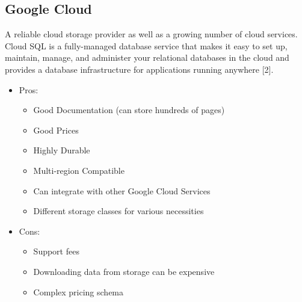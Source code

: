 \documentclass{article}
\begin{document}
\subsection{Google Cloud}
A reliable cloud storage provider as well as a growing number of cloud services. Cloud SQL is a fully-managed database service that makes it easy to set up, maintain, manage, and administer your relational databases in the cloud and provides a database infrastructure for applications running anywhere [2].
\begin{itemize}
\item Pros:
\begin{itemize}
\item Good Documentation (can store hundreds of pages)
\item Good Prices 
\item Highly Durable
\item Multi-region Compatible
\item Can integrate with other Google Cloud Services
\item Different storage classes for various necessities
\end{itemize}
\end{itemize}
\begin{itemize}
\item Cons:
\begin{itemize}
\item Support fees
\item Downloading data from storage can be expensive
\item Complex pricing schema \newline \newline
\end{itemize}
\end{itemize}
\end{document}
